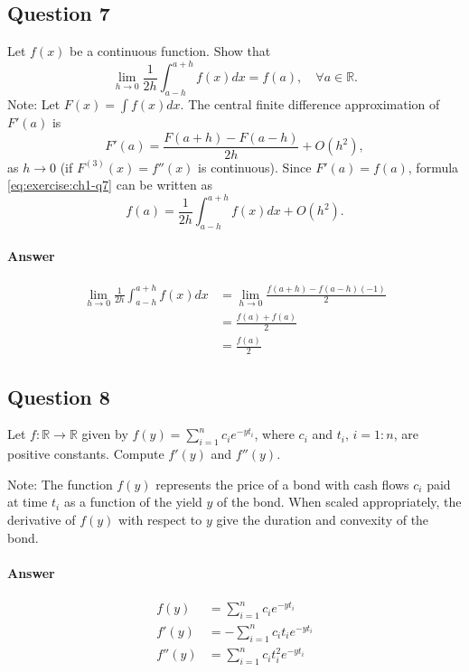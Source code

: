 \subsection{Question 7}
Let $ f(x) $ be a continuous function.
Show that
\begin{equation*}
    \lim_{h \rightarrow 0} \frac{1}{2 h} \int_{a - h}^{a + h} f (x) dx =
        f (a), \quad \forall a \in \mathbb{R}.
\end{equation*}
Note: Let $ F(x) = \int f(x) dx $.
The central finite difference approximation of $ F'(a) $ is
\begin{equation}
    F'(a) = \frac{F(a + h) - F(a - h)}{2 h} + O(h^2),
    \label{eq:exercise:ch1-q7}
\end{equation}
as $ h \rightarrow 0 $ (if $ F^{(3)} (x) = f''(x) $ is continuous).
Since $ F'(a) = f(a) $, formula \eqref{eq:exercise:ch1-q7} can be written as
\begin{equation*}
    f(a) = \frac{1}{2 h} \int_{a - h}^{a + h} f(x) dx + O(h^2).
\end{equation*}

\paragraph{Answer}
\begin{align*}
    \lim_{h \rightarrow 0} \frac{1}{2 h} \int_{a - h}^{a + h} f (x) dx
        &= \lim_{h \rightarrow 0} \frac{f(a + h) - f(a - h)(-1)}{2} \\
        &= \frac{f(a) + f(a)}{2} \\
        &= \frac{f(a)}{2}
\end{align*}

\subsection{Question 8}
Let $ f : \mathbb{R} \rightarrow \mathbb{R} $ given by
    $ f(y) = \sum_{i=1}^{n} c_i e^{-y t_i} $, where $ c_i $ and $ t_i $,
    $ i = 1 : n $, are positive constants.
Compute $ f'(y) $ and $ f''(y) $.

Note: The function $ f(y) $ represents the price of a bond with cash flows
    $ c_i $ paid at time $ t_i $ as a function of the yield $ y $ of the bond.
When scaled appropriately, the derivative of $ f(y) $ with respect to $ y $
give the duration and convexity of the bond.

\paragraph{Answer}
\begin{align*}
    f(y) &= \sum_{i=1}^{n} c_i e^{-y t_i} \\
    f'(y) &= -\sum_{i=1}^{n} c_i t_i e^{-y t_i} \\
    f''(y) &= \sum_{i=1}^{n} c_i t_i^2 e^{-y t_i}
\end{align*}

